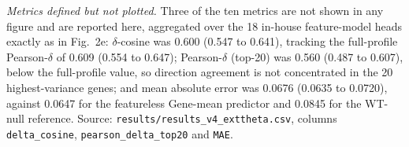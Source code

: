 \documentclass[11pt,letterpaper]{article}
\begin{document}
\medskip
\noindent\textit{Metrics defined but not plotted.} Three of the ten metrics are not shown in any figure and are reported here, aggregated over the 18 in-house feature-model heads exactly as in Fig.~2e: $\delta$-cosine was 0.600 (0.547 to 0.641), tracking the full-profile Pearson-$\delta$ of 0.609 (0.554 to 0.647); Pearson-$\delta$ (top-20) was 0.560 (0.487 to 0.607), below the full-profile value, so direction agreement is not concentrated in the 20 highest-variance genes; and mean absolute error was 0.0676 (0.0635 to 0.0720), against 0.0647 for the featureless Gene-mean predictor and 0.0845 for the WT-null reference. Source: \texttt{results/results\_v4\_exttheta.csv}, columns \texttt{delta\_cosine}, \texttt{pearson\_delta\_top20} and \texttt{MAE}.
\end{document}
